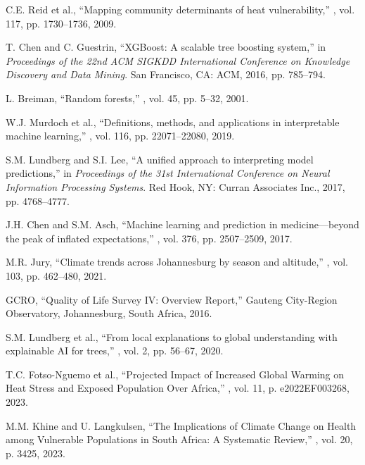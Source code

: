 \documentclass[11pt,a4paper]{article}
\begin{document}
\begin{thebibliography}{99}
C.E. Reid et al.,
\newblock ``Mapping community determinants of heat vulnerability,''
, vol. 117, pp. 1730--1736, 2009.

T. Chen and C. Guestrin,
\newblock ``XGBoost: A scalable tree boosting system,'' in {\em Proceedings of the 22nd ACM SIGKDD International Conference on Knowledge Discovery and Data Mining}.
\newblock San Francisco, CA: ACM, 2016, pp. 785--794.

L. Breiman,
\newblock ``Random forests,''
, vol. 45, pp. 5--32, 2001.

W.J. Murdoch et al.,
\newblock ``Definitions, methods, and applications in interpretable machine learning,''
, vol. 116, pp. 22071--22080, 2019.

S.M. Lundberg and S.I. Lee,
\newblock ``A unified approach to interpreting model predictions,'' in {\em Proceedings of the 31st International Conference on Neural Information Processing Systems}.
\newblock Red Hook, NY: Curran Associates Inc., 2017, pp. 4768--4777.

J.H. Chen and S.M. Asch,
\newblock ``Machine learning and prediction in medicine—beyond the peak of inflated expectations,''
, vol. 376, pp. 2507--2509, 2017.

M.R. Jury,
\newblock ``Climate trends across Johannesburg by season and altitude,''
, vol. 103, pp. 462--480, 2021.

GCRO,
\newblock ``Quality of Life Survey IV: Overview Report,''
\newblock Gauteng City-Region Observatory, Johannesburg, South Africa, 2016.

S.M. Lundberg et al.,
\newblock ``From local explanations to global understanding with explainable AI for trees,''
, vol. 2, pp. 56--67, 2020.

T.C. Fotso-Nguemo et al.,
\newblock ``Projected Impact of Increased Global Warming on Heat Stress and Exposed Population Over Africa,''
, vol. 11, p. e2022EF003268, 2023.

M.M. Khine and U. Langkulsen,
\newblock ``The Implications of Climate Change on Health among Vulnerable Populations in South Africa: A Systematic Review,''
, vol. 20, p. 3425, 2023.


\end{thebibliography}
\end{document}

